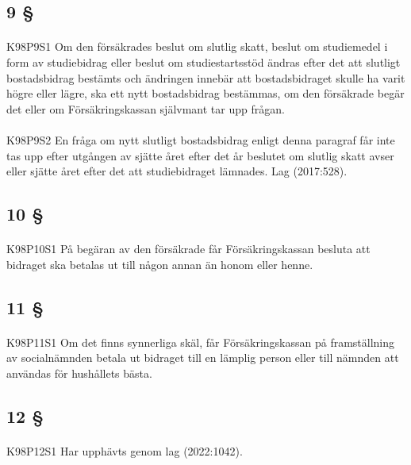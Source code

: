 \documentclass[a4paper,notitlepage,openany,10pt]{book}
\begin{document}
\subsection*{9 §}
\paragraph*{}
{\tiny K98P9S1}
Om den försäkrades beslut om slutlig skatt, beslut om studiemedel i form av studiebidrag eller beslut om studiestartsstöd ändras efter det att slutligt bostadsbidrag bestämts och ändringen innebär att bostadsbidraget skulle ha varit högre eller lägre, ska ett nytt bostadsbidrag bestämmas, om den försäkrade begär det eller om Försäkringskassan självmant tar upp frågan.
\paragraph*{}
{\tiny K98P9S2}
En fråga om nytt slutligt bostadsbidrag enligt denna paragraf får inte tas upp efter utgången av sjätte året efter det år beslutet om slutlig skatt avser eller sjätte året efter det att studiebidraget lämnades.
Lag (2017:528).
\subsection*{10 §}
\paragraph*{}
{\tiny K98P10S1}
På begäran av den försäkrade får Försäkringskassan besluta att bidraget ska betalas ut till någon annan än honom eller henne.
\subsection*{11 §}
\paragraph*{}
{\tiny K98P11S1}
Om det finns synnerliga skäl, får Försäkringskassan på framställning av socialnämnden betala ut bidraget till en lämplig person eller till nämnden att användas för hushållets bästa.
\subsection*{12 §}
\paragraph*{}
{\tiny K98P12S1}
Har upphävts genom
lag (2022:1042).
\end{document}
